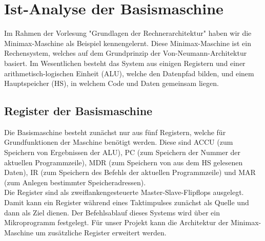\documentclass[12pt,titlepage,german,a4]{article}
\begin{document}
    \newpage

    \section{Ist-Analyse der Basismaschine}
    Im Rahmen der Vorlesung "Grundlagen der Rechnerarchitektur" haben wir die Minimax-Maschine als Beispiel kennengelernt. Diese Minimax-Maschine ist ein Rechensystem, welches auf dem Grundprinzip der Von-Neumann-Architektur  basiert. Im Wesentlichen  besteht das System aus einigen Registern und einer arithmetisch-logischen Einheit (ALU), welche den Datenpfad bilden, und einem Hauptspeicher (HS), in welchem Code und Daten gemeinsam liegen.

    \subsection{Register der Basismaschine}
    Die Basismaschine besteht zun{\"a}chst nur aus f{\"u}nf Registern, welche f{\"u}r Grundfunktionen der Maschine ben{\"o}tigt werden. Diese sind ACCU (zum Speichern von Ergebnissen der ALU), PC (zum Speichern der Nummer der aktuellen Programmzeile), MDR (zum Speichern von aus dem HS gelesenen Daten), IR (zum Speichern des Befehls der aktuellen Programmzeile) und MAR (zum Anlegen bestimmter Speicheradressen).\\
    Die Register sind als zweiflankengesteuerte Master-Slave-Flipflops ausgelegt. Damit kann ein Register w{\"a}hrend eines Taktimpulses zun{\"a}chst als Quelle und dann als Ziel dienen. Der Befehlsablauf dieses Systems wird {\"u}ber ein Mikroprogramm festgelegt. F{\"u}r unser Projekt kann die Architektur der Minimax-Maschine um zus{\"a}tzliche Register erweitert werden.
\end{document}
